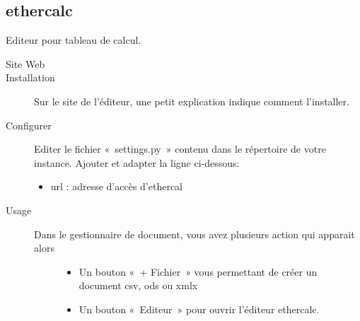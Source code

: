 \documentclass[a4paper,10pt,oneside,french]{sphinxmanual}
\begin{document}
\noindent{}


\subsection{ethercalc}
\label{\detokenize{documents/editor:ethercalc}}
Editeur pour tableau de calcul.
\begin{description}
\item[{Site Web}] \leavevmode
{}

\item[{Installation}] \leavevmode
Sur le site de l’éditeur, une petit explication indique comment l’installer.

\item[{Configurer}] \leavevmode
Editer le fichier « settings.py » contenu dans le répertoire de votre instance.
Ajouter et adapter la ligne ci-dessous:
\begin{itemize}
\item {} 
url : adresse d’accès d’ethercal

\end{itemize}

\end{description}

\begin{sphinxVerbatim}[commandchars=\\\{\}]
   
\end{sphinxVerbatim}
\begin{description}
\item[{Usage}] \leavevmode\begin{description}
\item[{Dans le gestionnaire de document, vous avez plusieurs action qui apparait alors}] \leavevmode\begin{itemize}
\item {} 
Un bouton « + Fichier » vous permettant de créer un document csv, ods ou xmlx

\item {} 
Un bouton « Editeur » pour ouvrir l’éditeur ethercalc.

\end{itemize}

\end{description}

\end{description}
\end{document}
